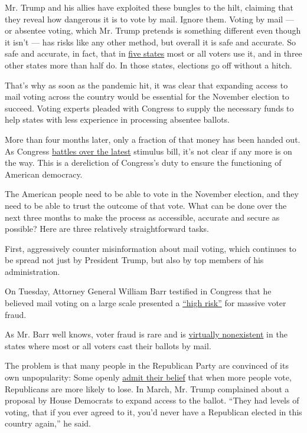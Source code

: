 Mr. Trump and his allies have exploited these bungles to the hilt,
claiming that they reveal how dangerous it is to vote by mail. Ignore
them. Voting by mail --- or absentee voting, which Mr. Trump pretends is
something different even though it isn't --- has risks like any other
method, but overall it is safe and accurate. So safe and accurate, in
fact, that in
\href{https://www.ncsl.org/research/elections-and-campaigns/all-mail-elections.aspx}{five
states} most or all voters use it, and in three other states more than
half do. In those states, elections go off without a hitch.

That's why as soon as the pandemic hit, it was clear that expanding
access to mail voting across the country would be essential for the
November election to succeed. Voting experts pleaded with Congress to
supply the necessary funds to help states with less experience in
processing absentee ballots.

More than four months later, only a fraction of that money has been
handed out. As Congress
\href{https://www.nytimes.com/2020/07/30/opinion/mitch-mcconnell-coronavirus-economy.html}{battles
over the latest} stimulus bill, it's not clear if any more is on the
way. This is a dereliction of Congress's duty to ensure the functioning
of American democracy.

The American people need to be able to vote in the November election,
and they need to be able to trust the outcome of that vote. What can be
done over the next three months to make the process as accessible,
accurate and secure as possible? Here are three relatively
straightforward tasks.

First, aggressively counter misinformation about mail voting, which
continues to be spread not just by President Trump, but also by top
members of his administration.

On Tuesday, Attorney General William Barr testified in Congress that he
believed mail voting on a large scale presented a
\href{https://www.washingtonpost.com/video/politics/barr-states-that-mail-in-voting-could-lead-to-a-high-risk-of-fraud/2020/07/28/2db47f91-2c5f-41e3-904e-79072b68547d_video.html}{``high
risk''} for massive voter fraud.

As Mr. Barr well knows, voter fraud is rare and is
\href{https://docs.wixstatic.com/ugd/ef45f5_81a3affd554e4b5b9b5852f8fb3c10fd.pdf}{virtually
nonexistent} in the states where most or all voters cast their ballots
by mail.

The problem is that many people in the Republican Party are convinced of
its own unpopularity: Some openly
\href{https://www.washingtonpost.com/politics/2020/03/30/trump-voting-republicans/}{admit
their belief} that when more people vote, Republicans are more likely to
lose. In March, Mr. Trump complained about a proposal by House Democrats
to expand access to the ballot. ``They had levels of voting, that if you
ever agreed to it, you'd never have a Republican elected in this country
again,'' he said.

